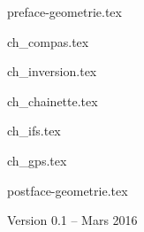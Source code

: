 \documentclass[11pt,twoside,openright]{report}
\begin{document}
\renewcommand{\contentsname}{Sommaire}

{preface-geometrie.tex}

\debutchapitres



{ch_compas.tex}

{ch_inversion.tex}

{ch_chainette.tex}

{ch_ifs.tex}
 
{ch_gps.tex}



{postface-geometrie.tex}

\vfill

\centerline{Version 0.1 -- Mars 2016}
\end{document}
